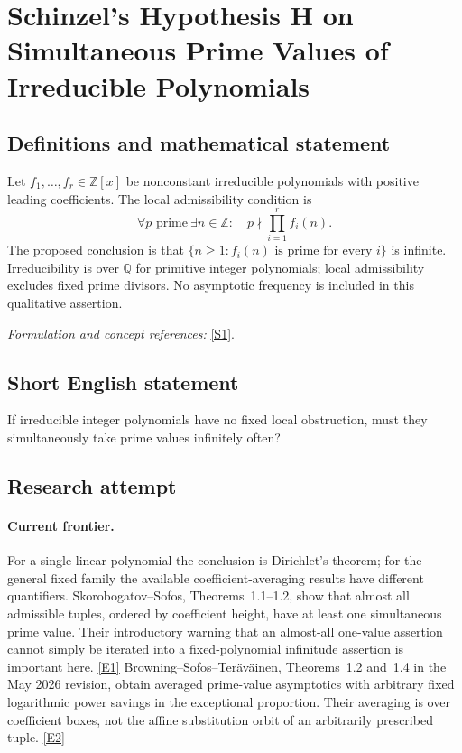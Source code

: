 \documentclass[11pt]{article}
\newcommand{\Z}{\mathbb{Z}}
\newcommand{\Q}{\mathbb{Q}}
\newcommand{\sref}[2]{\hyperlink{source:#1:#2}{[S#2]}}
\newcommand{\eref}[2]{\hyperlink{extra:#1:#2}{[E#2]}}
\newif\ifshowcatalogue
\newcommand{\cataloguescope}[1]{\ifshowcatalogue
 \paragraph{Exact scope in the supplied catalogue.}
 \begin{quote}\small #1\end{quote}\fi}
\begin{document}
\setcounter{section}{53}
\clearpage
\section{\texorpdfstring{Schinzel's Hypothesis H on Simultaneous Prime Values of Irreducible Polynomials}{Schinzel's Hypothesis H on Simultaneous Prime Values of Irreducible Polynomials}}\label{54}
\subsection{Definitions and mathematical statement}
Let $f_1,\ldots,f_r\in\Z[x]$ be nonconstant irreducible polynomials with positive leading coefficients. The local admissibility condition is
\[
 \forall p\text{ prime}\ \exists n\in\Z:\quad p\nmid\prod_{i=1}^r f_i(n).
\]
The proposed conclusion is that $\{n\ge1:f_i(n)\text{ is prime for every }i\}$ is infinite. Irreducibility is over $\Q$ for primitive integer polynomials; local admissibility excludes fixed prime divisors. No asymptotic frequency is included in this qualitative assertion.
\par\smallskip\textit{Formulation and concept references:} \sref{54}{1}.
\cataloguescope{Let f1,...,fr in Z[x] be irreducible with positive leading coefficients and no prime dividing f1(n)...fr(n) for every n. Prove that infinitely many positive integers n make every fi(n) prime.}
\subsection{Short English statement}
If irreducible integer polynomials have no fixed local obstruction, must they simultaneously take prime values infinitely often?
\subsection{Research attempt}

\paragraph{Current frontier.}
For a single linear polynomial the conclusion is Dirichlet's theorem;
for the general fixed family the available coefficient-averaging results
have different quantifiers. Skorobogatov--Sofos, Theorems~1.1--1.2,
show that almost all admissible tuples, ordered by coefficient height,
have at least one simultaneous prime value. Their introductory warning
that an almost-all one-value assertion cannot simply be iterated into a
fixed-polynomial infinitude assertion is important here. \eref{54}{1}
Browning--Sofos--Ter\"av\"ainen, Theorems~1.2 and~1.4 in the May 2026
revision, obtain averaged prime-value asymptotics with arbitrary fixed
logarithmic power savings in the exceptional proportion. Their averaging
is over coefficient boxes, not the affine substitution orbit of an
arbitrarily prescribed tuple. \eref{54}{2}
\end{document}
